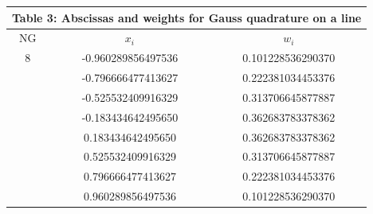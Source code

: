 \documentclass[12pt]{article}
\begin{document}
\begin{center}
\begin{tabular}{|c|c|c|}
\multicolumn{3}{c}{Table 3: Abscissas and weights for Gauss quadrature on a line}\\
\hline
NG & $x_i$ & $w_i$\\
\hline\hline
8 & -0.960289856497536 & 0.101228536290370\\
 & -0.796666477413627 & 0.222381034453376\\
 & -0.525532409916329 & 0.313706645877887\\
 & -0.183434642495650 & 0.362683783378362\\
 & 0.183434642495650 & 0.362683783378362\\
 & 0.525532409916329 & 0.313706645877887\\
 & 0.796666477413627 & 0.222381034453376\\
 & 0.960289856497536 & 0.101228536290370\\
\hline
\end{tabular}
\end{center}
\end{document}
